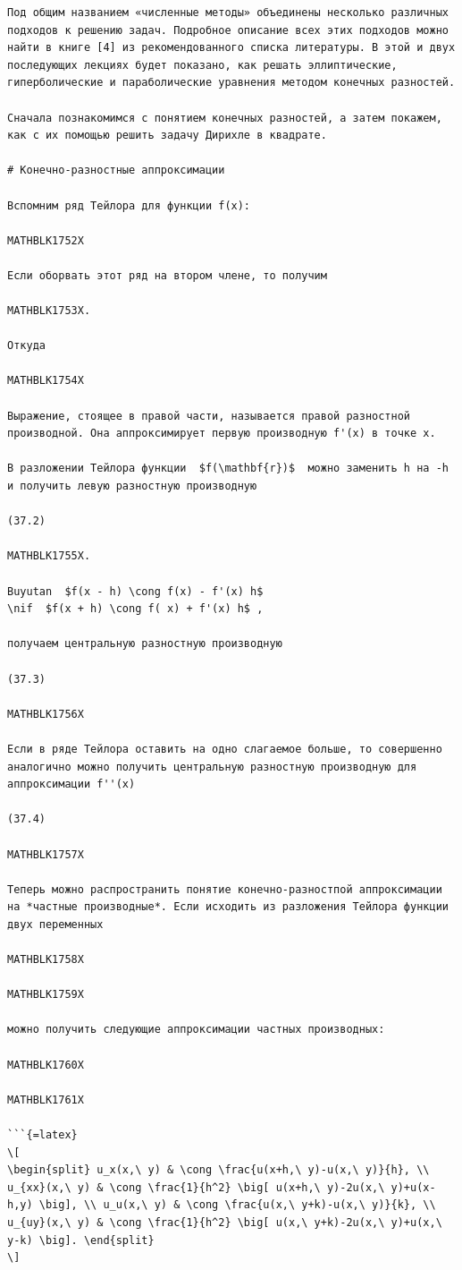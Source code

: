 \documentclass[
]{article}
\begin{document}
\begin{verbatim}
Под общим названием «численные методы» объединены несколько различных подходов к решению задач. Подробное описание всех этих подходов можно найти в книге [4] из рекомендованного списка литературы. В этой и двух последующих лекциях будет показано, как решать эллиптические, гиперболические и параболические уравнения методом конечных разностей.

Сначала познакомимся с понятием конечных разностей, а затем покажем, как с их помощью решить задачу Дирихле в квадрате.

# Конечно-разностные аппроксимации

Вспомним ряд Тейлора для функции f(x):

MATHBLK1752X

Если оборвать этот ряд на втором члене, то получим

MATHBLK1753X.

Откуда

MATHBLK1754X

Выражение, стоящее в правой части, называется правой разностной производной. Она аппроксимирует первую производную f'(x) в точке x.

В разложении Тейлора функции  $f(\mathbf{r})$  можно заменить h на -h и получить левую разностную производную

(37.2) 

MATHBLK1755X.

Buyutan  $f(x - h) \cong f(x) - f'(x) h$ 
\nif  $f(x + h) \cong f( x) + f'(x) h$ ,

получаем центральную разностную производную

(37.3) 

MATHBLK1756X

Если в ряде Тейлора оставить на одно слагаемое больше, то совершенно аналогично можно получить центральную разностную производную для аппроксимации f''(x)

(37.4) 

MATHBLK1757X

Теперь можно распространить понятие конечно-разностпой аппроксимации на *частные производные*. Если исходить из разложения Тейлора функции двух переменных

MATHBLK1758X

MATHBLK1759X

можно получить следующие аппроксимации частных производных:

MATHBLK1760X

MATHBLK1761X

```{=latex}
\[
\begin{split} u_x(x,\ y) & \cong \frac{u(x+h,\ y)-u(x,\ y)}{h}, \\ u_{xx}(x,\ y) & \cong \frac{1}{h^2} \big[ u(x+h,\ y)-2u(x,\ y)+u(x-h,y) \big], \\ u_u(x,\ y) & \cong \frac{u(x,\ y+k)-u(x,\ y)}{k}, \\ u_{uy}(x,\ y) & \cong \frac{1}{h^2} \big[ u(x,\ y+k)-2u(x,\ y)+u(x,\ y-k) \big]. \end{split}
\]
\end{verbatim}
\end{document}
